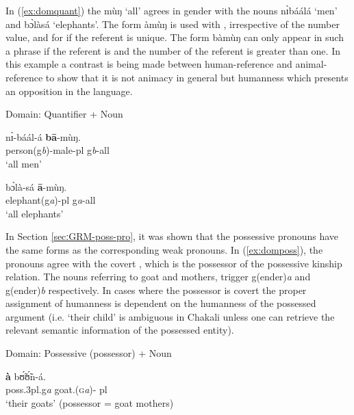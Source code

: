 \begin{exe}
\begin{exe}
\begin{exe}
\begin{exe}
\begin{exe}
\begin{exe}
\begin{exe}
\begin{exe}
\begin{exe}
\begin{exe}
\begin{exe}
In (\ref{ex:domquant}) the  {\sls mùŋ} `all' agrees in gender with the nouns {\sls nɪ̀báálá} `men' and {\sls bɔ̀làsá} `elephants'.  The form {\sls àmùŋ} is used with , irrespective of the number value, and for  if the referent is unique. The form  {\sls bàmùŋ} can only  appear in such a phrase if the referent is  and the number of the referent is greater than one. In this example a contrast is being made between human-reference and animal-reference to show that it is not animacy in general but humanness which presents an opposition in the language.


\newpage 

\ea\label{ex:domquant}{\rm Domain: Quantifier + Noun}\\
\ea\label{ex:domquantH+}

\gll   nɪ̀-báál-á  \textbf{bā}-mùŋ.\\
    {person({\sc g}{\it b})-male-{\sc pl}} {\sc g}{\it b}-{\sc all}\\
\glt `all men'\\

\ex\label{ex:domquantH-}

\gll   bɔ̀là-sá  \textbf{ā}-mùŋ.\\
  {elephant({\sc g}{\it a})-{\sc pl}}  {\sc g}{\it a}-{\sc all}\\
\glt `all elephants'\\


\z 
 \z

In Section \ref{secːGRM-poss-pro}, it was shown   that the possessive pronouns have the same forms as the corresponding weak pronouns.  In (\ref{ex:domposs}),  the  pronouns agree with the covert , which is the possessor of the possessive kinship relation. The nouns referring to goat and  mothers, trigger {\sc g(ender)}{\it a} and {\sc g(ender)}{\it b} respectively. In cases where the possessor is covert the proper assignment of humanness is dependent on the humanness of the possessed argument (i.e. `their child' is ambiguous in Chakali unless one can retrieve the relevant semantic  information of the possessed entity).

\ea\label{ex:domposs}{\rm Domain: Possessive (possessor) + Noun}\\

\ea\label{ex:dompossH-}

\gll  \textbf{à}   bʊ̃́ʊ̃́n-á.\\
   {\sc poss.3pl.g}{\it a} {goat.(\textsc{g}{\it a})-{\sc
pl}}\\
\glt `their goats' (possessor = goat mothers) 


\end{exe}
\end{exe}
\end{exe}
\end{exe}
\end{exe}
\end{exe}
\end{exe}
\end{exe}
\end{exe}
\end{exe}
\end{exe}
